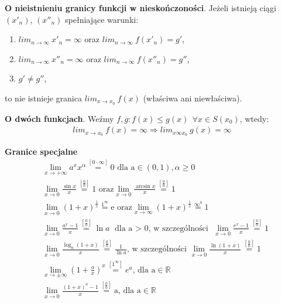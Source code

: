\documentclass[main.tex]{subfiles}
\begin{document}
    \begin{theorem}
        \textbf{O nieistnieniu granicy funkcji w nieskończoności}. Jeżeli istnieją ciągi $(x'_n)$, $(x''_n)$
        spełniające warunki:
        \begin{enumerate}
            \item $lim_{n \rightarrow \infty} ~ x'_n = \infty $ oraz $ lim_{n \rightarrow \infty} ~ f(x'_n) = g'$,
            \item $lim_{n \rightarrow \infty} ~ x''_n = \infty $ oraz $ lim_{n \rightarrow \infty} ~ f(x''_n) = g''$,
            \item $g' \neq g''$,
        \end{enumerate}
        to nie istnieje granica $lim_{x \rightarrow x_0} ~ f(x)$ (właściwa ani niewłaściwa).
    \end{theorem}

    \begin{theorem}
        \textbf{O dwóch funkcjach}. Weźmy $f, g: f(x) \leq g(x) ~~ \forall x \in S(x_0)$, wtedy:
        \begin{gather*}
            lim_{x \rightarrow x_0} ~ f(x) = \infty \Rightarrow lim_{x \infty x_0} ~ g(x) = \infty
        \end{gather*}
    \end{theorem}

    \textbf{Granice specjalne}
    \setlength{\jot}{10pt}
    \begin{align*}
        &\lim_{x \to +\infty} a^{x} x^{\alpha} \stackrel{[0 \cdot \infty]}{=}  \text{0 dla a} \in (0, 1), \alpha \geq 0 \\
        &\lim_{x \to 0} \frac{\sin{x}}{x} \stackrel{[\frac{0}{0}]}{=} \text{1 oraz}    \lim_{x \to 0} \frac{\arcsin{x}}{x} \stackrel{[\frac{0}{0}]}{=} 1\\
        &\lim_{x \to 0} (1 + x)^{\frac{1}{x}} \stackrel{1^{\infty}}{=} \text{e oraz}   \lim_{x \to \infty} (1 + x)^{\frac{1}{x}} \stackrel{\infty^{0}}{=} 1 \\
        &\lim_{x \to 0} \frac{a^x -1}{x} \stackrel{[\frac{0}{0}]}{=} \ln{a} \text{ dla a $>$ 0, w szczególności } \lim_{x \to 0} \frac{e^x -1}{x} \stackrel{[\frac{0}{0}]}{=} 1 \\
        &\lim_{x \to 0} \frac{\log_{a}(1 + x)}{x} \stackrel{[\frac{0}{0}]}{=} \frac{1}{\ln{a}} \text{, w szczególności } \lim_{x \to 0} \frac{\ln(1 + x)}{x} \stackrel{[\frac{0}{0}]}{=} 1 \\
        &\lim_{x \to \pm \infty} (1 + \frac{a}{x})^{x} \stackrel{[1^{\infty}]}{=} e^{a} \text{, dla a} \in \mathbb{R} \\
        &\lim_{x \to 0} \frac{(1 + x)^a - 1}{x} \stackrel{[\frac{0}{0}]}{=} \text{a, dla a} \in \mathbb{R}
    \end{align*}
\end{document}
